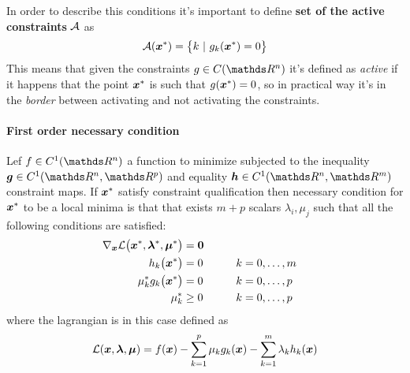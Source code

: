 	In order to describe this conditions it's important to define \textbf{set of the active constraints} $\mathcal A$ as
	\[ \mathcal A(\boldsymbol{x}^*) = \big\{ k \ | \ g_k(\boldsymbol{x}^*) = 0 \big\} \]
	This means that given the constraints $g\in C(\R^n)$ it's defined as \textit{active} if it happens that the point $\boldsymbol{x}^*$ is such that $g(\boldsymbol{x}^*) = 0$, so in practical way it's in the \textit{border} between activating and not activating the constraints.
	
	\paragraph{First order necessary condition} Lef $f\in C^1(\R^n)$ a function to minimize subjected to the inequality $\vett g\in C^1(\R^n,\R^p)$ and equality $\vett h \in C^1(\R^n,\R^m)$ constraint maps. If $\boldsymbol{x}^*$ satisfy constraint qualification then necessary condition for $\boldsymbol{x}^*$ to be a local minima is that that exists $m+p$ scalars $\lambda_i,\mu_j$ such that all the following conditions are satisfied:
	\begin{equation} \label{eq:min:kkt:firstnecessary}
	\begin{aligned}
		\nabla_{\boldsymbol{x}} \mathcal L \big(\boldsymbol{x}^*,\boldsymbol{\lambda}^*,\boldsymbol{\mu}^*\big) & = \boldsymbol{0} \\
		h_k\big(\boldsymbol{x}^*\big) & =  0 \qquad && k = 0,\dots, m\\
		\mu_k^* g_k\big(\boldsymbol{x}^*\big) & = 0 && k = 0,\dots, p \\
		\mu_k^* & \geq 0 && k = 0,\dots,p
	\end{aligned}
	\end{equation}
	where the lagrangian is in this case defined as
	\[ \mathcal L(\boldsymbol{x},\boldsymbol{\lambda},\boldsymbol{\mu}) = f(\boldsymbol{x}) - \sum_{k=1}^p \mu_k g_k(\boldsymbol{x})  - \sum_{k=1}^m \lambda_k h_k(\boldsymbol{x}) \]
	

